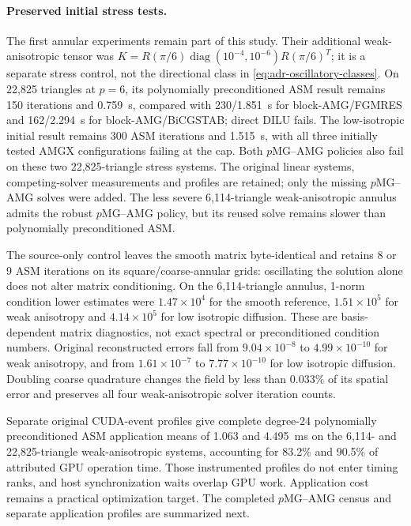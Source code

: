 \paragraph{Preserved initial stress tests.}
The first annular experiments remain part of this study. Their additional
weak-anisotropic tensor was
$K=R(\pi/6)\operatorname{diag}(10^{-4},10^{-6})R(\pi/6)^T$;
it is a separate stress control, not the directional class in
\eqref{eq:adr-oscillatory-classes}. On 22,825 triangles at $p=6$, its polynomially preconditioned ASM
result remains 150 iterations and 0.759~s, compared with 230/1.851~s for
block-AMG/FGMRES and 162/2.294~s for block-AMG/BiCGSTAB; direct DILU fails.
The low-isotropic initial result remains 300 ASM iterations and 1.515~s,
with all three initially tested AMGX configurations failing at the cap.
Both $p$MG--AMG policies also fail on these two 22,825-triangle stress systems.
The original linear systems, competing-solver measurements and profiles are
retained; only the missing $p$MG--AMG solves were added. The less severe
6,114-triangle weak-anisotropic annulus admits the robust $p$MG--AMG policy,
but its reused solve remains slower than polynomially preconditioned ASM.

The source-only control leaves the smooth matrix byte-identical and retains
8 or 9 ASM iterations on its square/coarse-annular grids: oscillating the
solution alone does not alter matrix conditioning. On the 6,114-triangle
annulus, 1-norm condition lower estimates were $1.47\times10^4$ for the smooth
reference, $1.51\times10^5$ for weak anisotropy and $4.14\times10^5$ for low
isotropic diffusion. These are basis-dependent matrix diagnostics, not exact
spectral or preconditioned condition numbers. Original reconstructed errors
fall from $9.04\times10^{-8}$ to $4.99\times10^{-10}$ for weak anisotropy,
and from $1.61\times10^{-7}$ to $7.77\times10^{-10}$ for low isotropic diffusion.
Doubling coarse quadrature changes the field by less than $0.033\%$ of its
spatial error and preserves all four weak-anisotropic solver iteration counts.

Separate original CUDA-event profiles give complete degree-24 polynomially preconditioned ASM
application means of 1.063 and 4.495~ms on the 6,114- and 22,825-triangle
weak-anisotropic systems, accounting for 83.2\% and 90.5\% of attributed GPU
operation time. Those instrumented profiles do not enter timing ranks, and
host synchronization waits overlap GPU work. Application cost remains a practical optimization target. The completed
$p$MG--AMG census and separate application profiles are summarized next.
